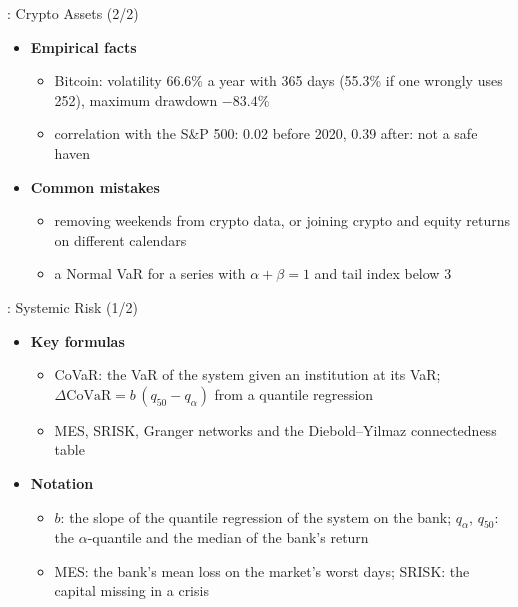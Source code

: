\begin{frame}{: Crypto Assets (2/2)}
\itemsize{\small}
\begin{itemize}
    \item \textbf{Empirical facts}
    \begin{itemize}
        \item Bitcoin: volatility 66.6\% a year with 365 days (55.3\% if one wrongly uses 252), maximum drawdown $-83.4\%$
        \item correlation with the S\&P 500: 0.02 before 2020, 0.39 after: not a safe haven
    \end{itemize}
    \item \textbf{Common mistakes}
    \begin{itemize}
        \item removing weekends from crypto data, or joining crypto and equity returns on different calendars
        \item a Normal VaR for a series with $\alpha + \beta = 1$ and tail index below 3
    \end{itemize}
\end{itemize}
\end{frame}

\begin{frame}{: Systemic Risk (1/2)}
\itemsize{\small}
\begin{itemize}
    \item \textbf{Key formulas}
    \begin{itemize}
        \item CoVaR: the VaR of the system given an institution at its VaR; $\Delta\mathrm{CoVaR} = b\,(q_{50} - q_\alpha)$ from a quantile regression 
        \item MES, SRISK, Granger networks and the Diebold--Yilmaz connectedness table 
    \end{itemize}
    \item \textbf{Notation}
    \begin{itemize}
        \item $b$: the slope of the quantile regression of the system on the bank; $q_\alpha$, $q_{50}$: the $\alpha$-quantile and the median of the bank's return
        \item MES: the bank's mean loss on the market's worst days; SRISK: the capital missing in a crisis
    \end{itemize}
\end{itemize}
\end{frame}

